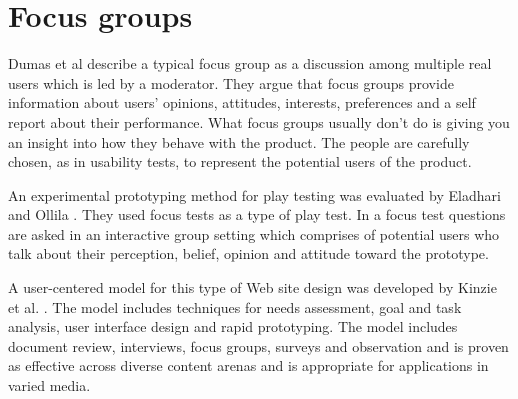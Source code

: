 \section{Focus groups}

Dumas et al \cite{dumas1999practical} describe a typical focus group as a discussion among multiple real users which is led by a moderator. They argue that focus groups provide information about users' opinions, attitudes, interests, preferences and a self report about their performance. What focus groups usually don't do is giving you an insight into how they behave with the product. The people are carefully chosen, as in usability tests, to represent the potential users of the product.

An experimental prototyping method for play testing was evaluated by Eladhari and Ollila \cite{eladhari2012design}. They used focus tests as a type of play test. In a focus test questions are asked in an interactive group setting which comprises of potential users who talk about their perception, belief, opinion and attitude toward the prototype.

A user-centered model for this type of Web site design was developed by Kinzie et al. \cite{kinzie2002user}. The model includes techniques for needs assessment, goal and task analysis, user interface design and rapid prototyping. The model includes document
review, interviews, focus groups, surveys and observation and is proven as effective across diverse content arenas and is appropriate for applications in varied media.

%
%

